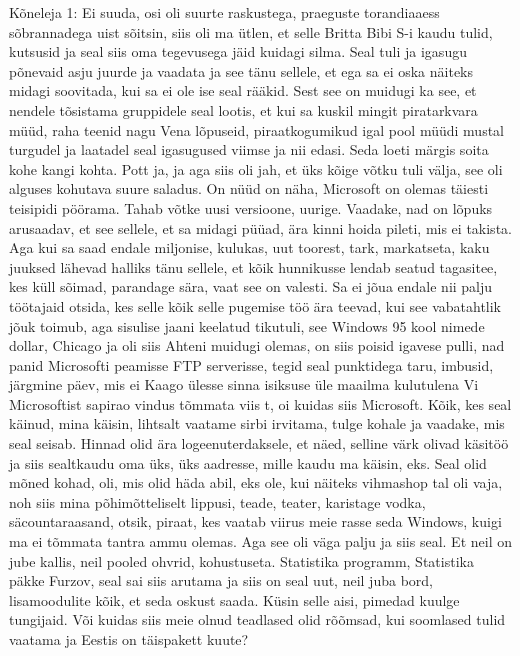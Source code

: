 Kõneleja 1:
Ei suuda, osi oli suurte raskustega, praeguste torandiaaess sõbrannadega uist sõitsin, siis oli ma ütlen, et selle Britta Bibi S-i kaudu tulid, kutsusid ja seal siis oma tegevusega jäid kuidagi silma. Seal tuli ja igasugu põnevaid asju juurde ja vaadata ja see tänu sellele, et ega sa ei oska näiteks midagi soovitada, kui sa ei ole ise seal rääkid. Sest see on muidugi ka see, et nendele tõsistama gruppidele seal lootis, et kui sa kuskil mingit piratarkvara müüd, raha teenid nagu Vena lõpuseid, piraatkogumikud igal pool müüdi mustal turgudel ja laatadel seal igasugused viimse ja nii edasi. Seda loeti märgis soita kohe kangi kohta. Pott ja, ja aga siis oli jah, et üks kõige võtku tuli välja, see oli alguses kohutava suure saladus. On nüüd on näha, Microsoft on olemas täiesti teisipidi pöörama. Tahab võtke uusi versioone, uurige. Vaadake, nad on lõpuks arusaadav, et see sellele, et sa midagi püüad, ära kinni hoida pileti, mis ei takista. Aga kui sa saad endale miljonise, kulukas, uut toorest, tark, markatseta, kaku juuksed lähevad halliks tänu sellele, et kõik hunnikusse lendab seatud tagasitee, kes küll sõimad, parandage sära, vaat see on valesti. Sa ei jõua endale nii palju töötajaid otsida, kes selle kõik selle pugemise töö ära teevad, kui see vabatahtlik jõuk toimub, aga sisulise jaani keelatud tikutuli, see Windows 95 kool nimede dollar, Chicago ja oli siis Ahteni muidugi olemas, on siis poisid igavese pulli, nad panid Microsofti peamisse FTP serverisse, tegid seal punktidega taru, imbusid, järgmine päev, mis ei Kaago ülesse sinna isiksuse üle maailma kulutulena Vi Microsoftist sapirao vindus tõmmata viis t, oi kuidas siis Microsoft. Kõik, kes seal käinud, mina käisin, lihtsalt vaatame sirbi irvitama, tulge kohale ja vaadake, mis seal seisab. Hinnad olid ära logeenuterdaksele, et näed, selline värk olivad käsitöö ja siis sealtkaudu oma üks, üks aadresse, mille kaudu ma käisin, eks.
Seal olid mõned kohad, oli, mis olid häda abil, eks ole, kui näiteks vihmashop tal oli vaja, noh siis mina põhimõtteliselt lippusi, teade, teater, karistage vodka, säcountaraasand, otsik, piraat, kes vaatab viirus meie rasse seda Windows, kuigi ma ei tõmmata tantra ammu olemas. Aga see oli väga palju ja siis seal.
Et neil on jube kallis, neil pooled ohvrid, kohustuseta. Statistika programm, Statistika päkke Furzov, seal sai siis arutama ja siis on seal uut, neil juba bord, lisamoodulite kõik, et seda oskust saada. Küsin selle aisi, pimedad kuulge tungijaid.
Või kuidas siis meie olnud teadlased olid rõõmsad, kui soomlased tulid vaatama ja Eestis on täispakett kuute?
                 
